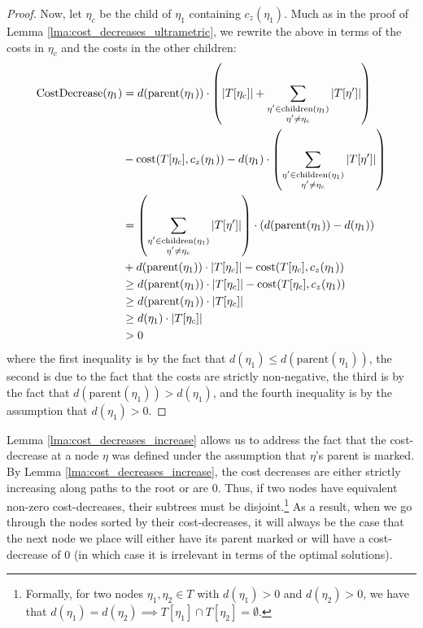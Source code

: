 \begin{proof}
    \noindent Now, let $\eta_c$ be the child of $\eta_1$ containing $c_z(\eta_1)$. Much as in the proof of Lemma \ref{lma:cost_decreases_ultrametric}, we
    rewrite the above in terms of the costs in $\eta_c$ and the costs in the other children:
    \begingroup
    \allowdisplaybreaks
    \begin{align*}
        \text{CostDecrease}(\eta_1) &= d(\text{parent}(\eta_1)) \cdot \left( |T[\eta_c]| + \sum_{\substack{\eta' \in \text{children}(\eta_1) \\ \eta' \neq \eta_c}} |T[\eta']| \right) \\
        & - \text{cost}(T[\eta_c], c_z(\eta_1)) - d(\eta_1) \cdot \left( \sum_{\substack{\eta' \in \text{children}(\eta_1) \\ \eta' \neq \eta_c}} |T[\eta']| \right) \\
        &= \left( \sum_{\substack{\eta' \in \text{children}(\eta_1) \\ \eta' \neq \eta_c}} |T[\eta']| \right)\cdot (d(\text{parent}(\eta_1)) - d(\eta_1)) \\
        &+ d(\text{parent}(\eta_1)) \cdot |T[\eta_c]| - \text{cost}(T[\eta_c], c_z(\eta_1)) \\
        &\geq d(\text{parent}(\eta_1)) \cdot |T[\eta_c]| - \text{cost}(T[\eta_c], c_z(\eta_1)) \\
        &\geq d(\text{parent}(\eta_1)) \cdot |T[\eta_c]| \\
        &\geq d(\eta_1) \cdot |T[\eta_c]| \\
        &> 0
    \end{align*}
    \endgroup
    where the first inequality is by the fact that $d(\eta_1) \leq d(\text{parent}(\eta_1))$, the second is due to the fact that the costs are strictly
    non-negative, the third is by the fact that $d(\text{parent}(\eta_1)) > d(\eta_1)$, and the fourth inequality is by the assumption that $d(\eta_1) > 0$.

\end{proof}


Lemma \ref{lma:cost_decreases_increase} allows us to address the fact that the cost-decrease at a node $\eta$ was defined under the assumption that $\eta$'s
parent is marked. By Lemma \ref{lma:cost_decreases_increase}, the cost decreases are either strictly increasing along paths to the root or are $0$. Thus, if two
nodes have equivalent non-zero cost-decreases, their subtrees must be disjoint.\footnote{Formally, for two nodes $\eta_1, \eta_2 \in T$ with $d(\eta_1) > 0$ and
$d(\eta_2) > 0$, we have that $d(\eta_1) = d(\eta_2) \implies T[\eta_1] \cap T[\eta_2] = \emptyset$.} As a result, when we go through the nodes sorted by their
cost-decreases, it will always be the case that the next node we place will either have its parent marked or will have a cost-decrease of $0$ (in which case it
is irrelevant in terms of the optimal solutions).

